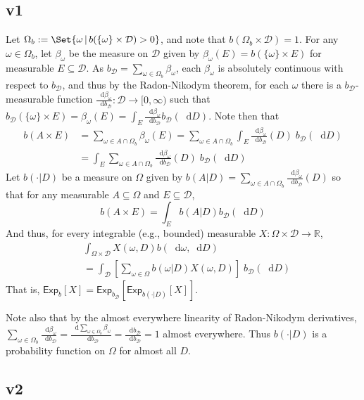 \documentclass[a4paper]{article}
\newcommand\Exp{\mathsf{Exp}}
\newcommand{\Decs}{\mathcal{D}}
\renewcommand{\Re}{\mathbb{R}}
\renewcommand{\color}[1]{}
\newenvironment{colored}[1]{\leavevmode\color{#1}}{}
\newcommand\SetDelimiter[1][]{
	\nonscript\,#1\vert \allowbreak \nonscript\,\mathopen{}}
\providecommand\given{\SetDelimiter}
\newcommand*\diff{\mathop{}\!\mathrm{d}}
\newenvironment{CCM rewritten}
{\begingroup\color{blue}} %
{\endgroup}              %
\begin{document}
\begin{colored}{violet}
\begin{colored}{red}
	\subsection{v1}
Let $\Omega_b:=\Set{\omega\given b(\{\omega\}\times\Decs)>0}$, and note that $b(\Omega_b\times\Decs)=1$. For any $\omega\in \Omega_b$, let $\beta_\omega$ be the measure on $\Decs$ given by $\beta_\omega(E)=b(\{\omega\}\times E)$ for measurable $E\subseteq \Decs$. 
As $b_\Decs=\sum_{\omega\in\Omega_b}\beta_\omega$, each $\beta_\omega$ is absolutely continuous with respect to $b_\Decs$, and thus by the Radon-Nikodym theorem, for each $\omega$ there is a $b_\Decs$-measurable function $\frac{\diff \beta_\omega}{\diff b_\Decs}:\Decs\to[0,\infty)$ such that $b_\Decs(\{\omega\}\times E)=\beta_\omega(E)=\int_E \frac{\diff \beta_\omega}{\diff b_\Decs}b_\Decs(\diff D)$.
Note then that \begin{align}
	b(A\times E)&=\sum_{\omega\in A\cap \Omega_b}\beta_\omega(E)=\sum_{\omega\in A\cap \Omega_b}\int_E \frac{\diff \beta_\omega}{\diff b_\Decs}(D)\;b_\Decs(\diff D)\\
	&=\int_E\sum_{\omega\in A\cap \Omega_b} \frac{\diff \beta_\omega}{\diff b_\Decs}(D)\;b_\Decs(\diff D)
\end{align}
Let $b(\cdot|D)$ be a measure on $\Omega$ given by $b(A|D)=\sum_{\omega\in A\cap \Omega_b} \frac{\diff \beta_\omega}{\diff b_\Decs}(D)$ so that for any measurable $A\subseteq\Omega$ and $E\subseteq\Decs$, 
\[
b(A\times E)=\int_E b(A|D) b_\Decs(\diff D)
\]
And thus,  for every integrable (e.g., bounded) measurable $X:\Omega\times\Decs\to\Re$, \begin{align}
	&\int_{\Omega\times \Decs} X(\omega,D) b(\diff \omega, \diff D)\\
	&=\int_\Decs \left[\sum_{\omega\in\Omega} b(\omega|D)X(\omega,D)\right]\;b_\Decs(\diff D)
\end{align}
That is, $\Exp_b[X]=\Exp_{b_\Decs}[\Exp_{b(\cdot|D)}[X]]$.

Note also that by the almost everywhere linearity of Radon-Nikodym derivatives, $\sum_{\omega\in\Omega_b}\frac{\diff \beta_\omega}{\diff b_\Decs}=\frac{\diff \sum_{\omega\in\Omega_b}\beta_\omega}{\diff b_\Decs}=\frac{\diff b_\Decs}{\diff b_\Decs}=1$ almost everywhere. Thus $b(\cdot|D)$ is a probability function on $\Omega$ for almost all $D$.


\subsection{v2}
	


\end{colored}
\end{colored}
\end{document}
